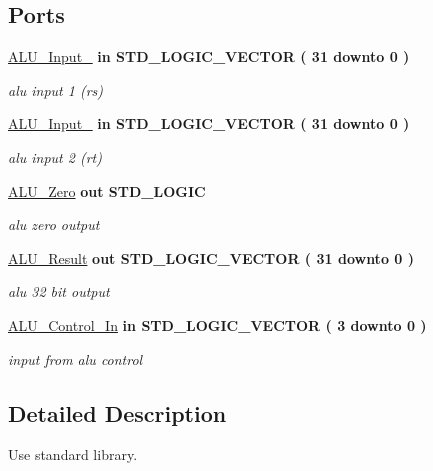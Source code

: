 \subsection*{\-Ports}
 \begin{DoxyCompactItemize}
\item 
\hyperlink{class_a_l_u_ad506dc3c4d5a49b33075dcf2ea057306}{\-A\-L\-U\-\_\-\-Input\-\_}  {\bfseries {\bfseries in }} {\bfseries \-S\-T\-D\-\_\-\-L\-O\-G\-I\-C\-\_\-\-V\-E\-C\-T\-O\-R (   31    downto    0  ) } 
\begin{DoxyCompactList}\small\item\em alu input 1 (rs) \end{DoxyCompactList}\item 
\hyperlink{class_a_l_u_a657f38dca67063612c1c3d9327260efd}{\-A\-L\-U\-\_\-\-Input\-\_}  {\bfseries {\bfseries in }} {\bfseries \-S\-T\-D\-\_\-\-L\-O\-G\-I\-C\-\_\-\-V\-E\-C\-T\-O\-R (   31    downto    0  ) } 
\begin{DoxyCompactList}\small\item\em alu input 2 (rt) \end{DoxyCompactList}\item 
\hyperlink{class_a_l_u_a15e59062cfee013b791bf90106bfe0a2}{\-A\-L\-U\-\_\-\-Zero}  {\bfseries {\bfseries out }} {\bfseries \-S\-T\-D\-\_\-\-L\-O\-G\-I\-C } 
\begin{DoxyCompactList}\small\item\em alu zero output \end{DoxyCompactList}\item 
\hyperlink{class_a_l_u_a75eaa7827fe89e680e452286e5f64e93}{\-A\-L\-U\-\_\-\-Result}  {\bfseries {\bfseries out }} {\bfseries \-S\-T\-D\-\_\-\-L\-O\-G\-I\-C\-\_\-\-V\-E\-C\-T\-O\-R (   31    downto    0  ) } 
\begin{DoxyCompactList}\small\item\em alu 32 bit output \end{DoxyCompactList}\item 
\hyperlink{class_a_l_u_a160e9acd866b7a383a28d77c159bd52a}{\-A\-L\-U\-\_\-\-Control\-\_\-\-In}  {\bfseries {\bfseries in }} {\bfseries \-S\-T\-D\-\_\-\-L\-O\-G\-I\-C\-\_\-\-V\-E\-C\-T\-O\-R (   3    downto    0  ) } 
\begin{DoxyCompactList}\small\item\em input from alu control \end{DoxyCompactList}\end{DoxyCompactItemize}


\subsection{\-Detailed \-Description}
\-Use standard library. 


